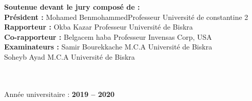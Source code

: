\begin{titlepage}
\begin{center}\large
\end{center}
\textbf{Soutenue devant le jury composé de : }\\
\textbf{Président : }\;\;\;\;\;\;\;\;\;Mohamed Benmohammed\tab[1.3cm] Professeur \tab[0.7cm] Université de constantine 2
\\
\textbf{Rapporteur : }\;\;\;\;\;\;Okba Kazar \;\tab[3.8cm] Professeur \tab[0.7cm]     Université de Biskra
\\
\textbf{Co-rapporteur : }\;Belgacem haba \;\tab[3.1cm] Professeur \tab[0.7cm]     Invensas Corp,  USA
\\
\textbf{Examinateurs :}
\;  Samir Bourekkache                \tab[2.50cm] M.C.A \tab[1.44cm]   Université de Biskra 
\\
\;\;\;\tab[2.9cm]  Soheyb Ayad \tab[3.7cm] M.C.A \tab[1.3cm] \;Université de Biskra  
\\
\\
\\
\begin{center}
Année universitaire : \textbf{2019 – 2020}
\end{center}


\end{titlepage}
